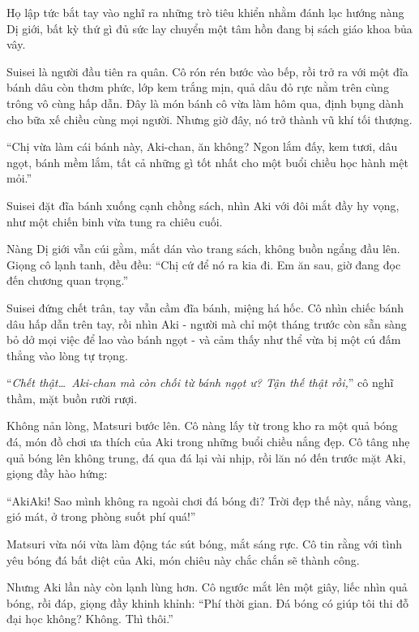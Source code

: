 \documentclass[../main.tex]{subfiles}
\begin{document}
Họ lập tức bắt tay vào nghĩ ra những trò tiêu khiển nhằm đánh lạc hướng nàng Dị giới, bất kỳ thứ gì đủ sức lay chuyển một tâm hồn đang bị sách giáo khoa bủa vây.

\ct

Suisei là người đầu tiên ra quân. Cô rón rén bước vào bếp, rồi trở ra với một đĩa bánh dâu còn thơm phức, lớp kem trắng mịn, quả dâu đỏ rực nằm trên cùng trông vô cùng hấp dẫn. Đây là món bánh cô vừa làm hôm qua, định bụng dành cho bữa xế chiều cùng mọi người. Nhưng giờ đây, nó trở thành vũ khí tối thượng.


``Chị vừa làm cái bánh này, Aki-chan, ăn không? Ngon lắm đấy, kem tươi, dâu ngọt, bánh mềm lắm, tất cả những gì tốt nhất cho một buổi chiều học hành mệt mỏi.''

Suisei đặt đĩa bánh xuống cạnh chồng sách, nhìn Aki với đôi mắt đầy hy vọng, như một chiến binh vừa tung ra chiêu cuối.

Nàng Dị giới vẫn cúi gằm, mắt dán vào trang sách, không buồn ngẩng đầu lên. Giọng cô lạnh tanh, đều đều: ``Chị cứ để nó ra kia đi. Em ăn sau, giờ đang đọc đến chương quan trọng.''

Suisei đứng chết trân, tay vẫn cầm đĩa bánh, miệng há hốc. Cô nhìn chiếc bánh dâu hấp dẫn trên tay, rồi nhìn Aki - người mà chỉ một tháng trước còn sẵn sàng bỏ dở mọi việc để lao vào bánh ngọt - và cảm thấy như thể vừa bị một cú đấm thẳng vào lòng tự trọng.

``\textit{Chết thật\dots\ Aki-chan mà còn chối từ bánh ngọt ư? Tận thế thật rồi,}'' cô nghĩ thầm, mặt buồn rười rượi.

\il

Không nản lòng, Matsuri bước lên. Cô nàng lấy từ trong kho ra một quả bóng đá, món đồ chơi ưa thích của Aki trong những buổi chiều nắng đẹp. Cô tâng nhẹ quả bóng lên không trung, đá qua đá lại vài nhịp, rồi lăn nó đến trước mặt Aki, giọng đầy hào hứng:


``AkiAki! Sao mình không ra ngoài chơi đá bóng đi? Trời đẹp thế này, nắng vàng, gió mát, ở trong phòng suốt phí quá!''

Matsuri vừa nói vừa làm động tác sút bóng, mắt sáng rực. Cô tin rằng với tình yêu bóng đá bất diệt của Aki, món chiêu này chắc chắn sẽ thành công.

Nhưng Aki lần này còn lạnh lùng hơn. Cô ngước mắt lên một giây, liếc nhìn quả bóng, rồi đáp, giọng đầy khinh khỉnh: ``Phí thời gian. Đá bóng có giúp tôi thi đỗ đại học không? Không. Thì thôi.''
\end{document}
